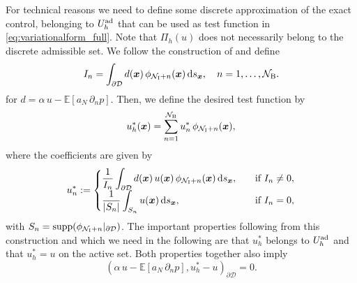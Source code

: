 \documentclass[a4paper,10pt]{article}
\newcommand{\bx}{{\boldsymbol{x}}}
\newcommand{\cD}{{\mathcal{D}}}
\newcommand{\E}{{\mathbb{E}}}
\renewcommand{\d}{\textup{d}}
\numberwithin{theorem}{section}
\begin{document}
For technical reasons we need to define some discrete approximation of the exact control, belonging to $U_h^{\textup{ad}}$ that can be used as test function in \eqref{eq:variationalform_full}. Note that $\Pi_h(u)$ does not necessarily belong to the discrete admissible set. We follow the construction of \cite{TApel_MMateos_JPfefferer_ARosch_2018,ECasas_JPRaymond_2006b} and define 
\begin{equation*}
	I_n = \int_{\partial\cD} d(\bx)\,\phi_{\mathcal N_{\textup{I}}+n}(\bx) \, \d s_{\bx},\quad n=1,\ldots,\mathcal N_{\textup B}.
\end{equation*}
for  $d = \alpha\,u - \E[a_N\,\partial_n p]$. Then, we define the desired test function by 
\begin{equation}\label{eq:def_uhstar}
	u_h^*(\bx) = \sum_{n=1}^{\mathcal N_{\textup{B}}} u_n^*\,\phi_{\mathcal N_{\textup{I}}+n}(\bx),
\end{equation}
where the coefficients are given by
\begin{equation*}
	u_n^* := \begin{cases}
	      \displaystyle\frac1{I_n} \int_{\partial\cD} d(\bx)\,u(\bx)\,\phi_{\mathcal N_{\textup{I}}+n}(\bx)\,\d s_{\bx}, &\quad \text{if}\ I_n\ne 0,\\
	      \displaystyle\frac{1}{|S_n|} \int_{S_n} u(\bx)\,\d s_{\bx}, &\quad\text{if}\ I_n=0,
	\end{cases}
\end{equation*}
with $S_n = \text{supp}(\phi_{\mathcal N_{\textup{I}}+n}|_{\partial\cD})$. The important properties following from this construction and which we need in the following are that $u_h^*$ belongs to $U_h^{\textup{ad}}$ and that $u_h^* = u$ on the active set. Both properties together also imply
\begin{equation}\label{eq:uhstar_in_varinequ}
	(\alpha\,u - \E[a_N\,\partial_n p], u_h^* - u)_{\partial\cD} = 0.
\end{equation}
\end{document}
